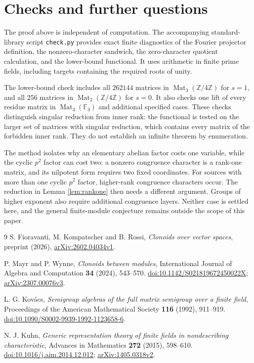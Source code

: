 \documentclass[11pt]{article}
\theoremstyle{remark}\newtheorem{remark}[theorem]{Remark}
\newcommand{\F}{\mathbb F}
\newcommand{\Z}{\mathbb Z}
\newcommand{\Mat}{\operatorname{Mat}}
\begin{document}
\section{Checks and further questions}

The proof above is independent of computation. The accompanying standard-library script \texttt{check.py} provides exact finite diagnostics of the Fourier projector definition, the nonzero-character sandwich, the zero-character quotient calculation, and the lower-bound functional. It uses arithmetic in finite prime fields, including targets containing the required roots of unity.

The lower-bound check includes all $262144$ matrices in $\Mat_3(\Z/4\Z)$ for $s=1$, and all $256$ matrices in $\Mat_2(\Z/4\Z)$ for $s=0$. It also checks one lift of every residue matrix in $\Mat_3(\F_3)$ and additional specified cases. These checks distinguish singular reduction from inner rank: the functional is tested on the larger set of matrices with singular reduction, which contains every matrix of the forbidden inner rank. They do not establish an infinite theorem by enumeration.

The method isolates why an elementary abelian factor costs one variable, while the cyclic $p^2$ factor can cost two: a nonzero congruence character is a rank-one matrix, and its nilpotent form requires two fixed coordinates. For sources with more than one cyclic $p^2$ factor, higher-rank congruence characters occur. The reduction in Lemma \ref{lem:rankone} then needs a different argument. Groups of higher exponent also require additional congruence layers. Neither case is settled here, and the general finite-module conjecture remains outside the scope of this paper.

\begin{thebibliography}{9}
S. Fioravanti, M. Kompatscher and B. Rossi,
\emph{Clonoids over vector spaces}, preprint (2026),
\href{https://arxiv.org/abs/2602.04034v1}{arXiv:2602.04034v1}.

P. Mayr and P. Wynne,
\emph{Clonoids between modules},
International Journal of Algebra and Computation \textbf{34} (2024), 543--570.
\href{https://doi.org/10.1142/S021819672450022X}{doi:10.1142/S021819672450022X};
\href{https://arxiv.org/abs/2307.00076v3}{arXiv:2307.00076v3}.

L. G. Kov\'acs,
\emph{Semigroup algebras of the full matrix semigroup over a finite field},
Proceedings of the American Mathematical Society \textbf{116} (1992), 911--919.
\href{https://doi.org/10.1090/S0002-9939-1992-1123658-6}{doi:10.1090/S0002-9939-1992-1123658-6}.

N. J. Kuhn,
\emph{Generic representation theory of finite fields in nondescribing characteristic},
Advances in Mathematics \textbf{272} (2015), 598--610.
\href{https://doi.org/10.1016/j.aim.2014.12.012}{doi:10.1016/j.aim.2014.12.012};
\href{https://arxiv.org/abs/1405.0318v2}{arXiv:1405.0318v2}.
\end{thebibliography}
\end{document}
